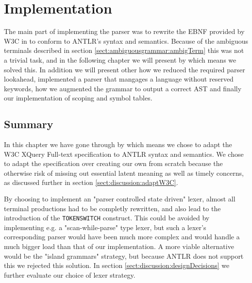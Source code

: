 \chapter{Implementation}
\label{chapter:implementation}

The main part of implementing the parser was to rewrite the EBNF provided by W3C in \cite{w3c01} to conform to ANTLR's syntax and semantics. Because of the ambiguous terminals described in section \ref{sect:ambiguousgrammar:ambigTerm} this was not a trivial task, and in the following chapter we will present by which means we solved this. In addition we will present other how we reduced the required parser lookahead, implemented a parser that mangages a language without reserved keywords, how we augmented the grammar to output a correct AST and finally our implementation of scoping and symbol tables.















\section{Summary}
In this chapter we have gone through by which means we chose to adapt the W3C
XQuery Full-text specification to ANTLR syntax and semantics. We chose to adapt
the specification over creating our own from scratch because the otherwise risk
of missing out essential latent meaning as well as timely concerns, as
discussed further in section \ref{sect:discussion:adaptW3C}.    

By choosing to implement an "parser controlled state driven" lexer, almost all
terminal productions  had to be completly rewritten, and also lead to the
introduction of the \verb!TOKENSWITCH! construct. This could be avoided by
implementing e.g. a "scan-while-parse" type lexer, but such a lexer's
corresponding parser would have been much more complex and would handle a much
bigger load than that of our implementation. A more viable alternative would be
the "island grammars" strategy, but because ANTLR does not support this we
rejected this solution. In section \ref{sect:discussion:designDecisions} we
further evaluate our choice of lexer strategy.

